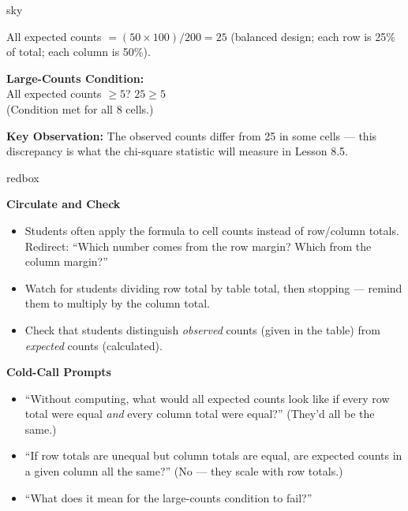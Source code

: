 \documentclass[10pt]{article}
\begin{document}
\begin{skillbox}[Lesson]{sky}
\begin{minipage}[t]{0.48\linewidth}
    \vspace{0.1in}
    All expected counts $= (50 \times 100)/200 = 25$
    (balanced design; each row is 25\% of total; each column is 50\%).

    \vspace{0.1in}
    \textbf{Large-Counts Condition:}\\
    All expected counts $\ge 5$? \quad $25 \ge 5$ \checkmark\\
    (Condition met for all 8 cells.)

    \vspace{0.1in}
    \textbf{Key Observation:} The observed counts differ from 25 in some cells ---
    this discrepancy is what the chi-square statistic will measure in Lesson 8.5.
\end{minipage}
\end{skillbox}

\begin{skillbox}{redbox}
\begin{minipage}[t]{0.48\linewidth}
    \textbf{Circulate and Check}
    \begin{itemize}
        \item Students often apply the formula to cell counts instead of row/column totals.
              Redirect: ``Which number comes from the row margin? Which from the column margin?''
        \item Watch for students dividing row total by table total, then stopping --- remind
              them to multiply by the column total.
        \item Check that students distinguish \emph{observed} counts (given in the table)
              from \emph{expected} counts (calculated).
    \end{itemize}
\end{minipage}
\hfill
\begin{minipage}[t]{0.48\linewidth}
    \textbf{Cold-Call Prompts}
    \begin{itemize}
        \item ``Without computing, what would all expected counts look like if every
              row total were equal \emph{and} every column total were equal?'' (They'd
              all be the same.)
        \item ``If row totals are unequal but column totals are equal, are expected
              counts in a given column all the same?'' (No --- they scale with row totals.)
        \item ``What does it mean for the large-counts condition to fail?''
    \end{itemize}
\end{minipage}
\end{skillbox}
\end{document}
